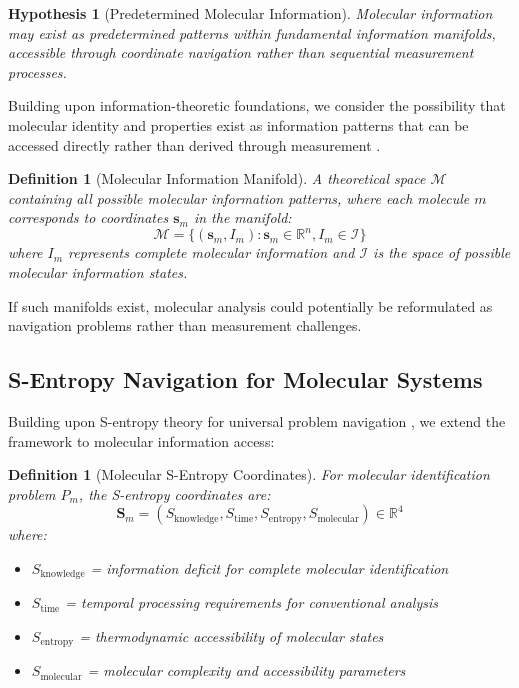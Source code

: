 \documentclass[11pt,a4paper]{article}
\newtheorem{definition}[theorem]{Definition}
\newtheorem{hypothesis}[theorem]{Hypothesis}
\theoremstyle{remark}
\begin{document}
\begin{hypothesis}[Predetermined Molecular Information]
Molecular information may exist as predetermined patterns within fundamental information manifolds, accessible through coordinate navigation rather than sequential measurement processes.
\end{hypothesis}

Building upon information-theoretic foundations, we consider the possibility that molecular identity and properties exist as information patterns that can be accessed directly rather than derived through measurement \cite{wheeler1989information,lloyd2006programming}.

\begin{definition}[Molecular Information Manifold]
A theoretical space $\mathcal{M}$ containing all possible molecular information patterns, where each molecule $m$ corresponds to coordinates $\mathbf{s}_m$ in the manifold:
$$\mathcal{M} = \{(\mathbf{s}_m, I_m) : \mathbf{s}_m \in \mathbb{R}^n, I_m \in \mathcal{I}\}$$
where $I_m$ represents complete molecular information and $\mathcal{I}$ is the space of possible molecular information states.
\end{definition}

If such manifolds exist, molecular analysis could potentially be reformulated as navigation problems rather than measurement challenges.

\subsection{S-Entropy Navigation for Molecular Systems}

Building upon S-entropy theory for universal problem navigation \cite{sachikonye2024sentropy}, we extend the framework to molecular information access:

\begin{definition}[Molecular S-Entropy Coordinates]
For molecular identification problem $P_m$, the S-entropy coordinates are:
$$\mathbf{S}_m = (S_{\text{knowledge}}, S_{\text{time}}, S_{\text{entropy}}, S_{\text{molecular}}) \in \mathbb{R}^4$$
where:
\begin{itemize}
\item $S_{\text{knowledge}}$ = information deficit for complete molecular identification
\item $S_{\text{time}}$ = temporal processing requirements for conventional analysis
\item $S_{\text{entropy}}$ = thermodynamic accessibility of molecular states
\item $S_{\text{molecular}}$ = molecular complexity and accessibility parameters
\end{itemize}
\end{definition}
\end{document}
